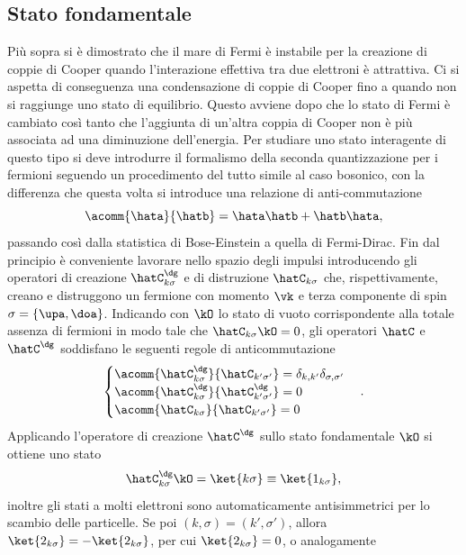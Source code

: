\subsection{Stato fondamentale}
Più sopra si è dimostrato che il mare di Fermi è instabile per la creazione di coppie di Cooper quando l'interazione effettiva tra due elettroni è attrattiva. Ci si aspetta di conseguenza una condensazione di coppie di Cooper fino a quando non si raggiunge uno stato di equilibrio. Questo avviene dopo che lo stato di Fermi è cambiato così tanto che l'aggiunta di un'altra coppia di Cooper non è più associata ad una diminuzione dell'energia. Per studiare uno stato interagente di questo tipo si deve introdurre il formalismo della seconda quantizzazione per i fermioni seguendo un procedimento del tutto simile al caso bosonico, con la differenza che questa volta si introduce una relazione di anti-commutazione
\begin{equation}
    \acomm{\hata}{\hatb} = \hata\hatb + \hatb\hata,
\end{equation}
passando così dalla statistica di Bose-Einstein a quella di Fermi-Dirac. Fin dal principio è conveniente lavorare nello spazio degli impulsi introducendo gli operatori di creazione $\hatC^\dg_{k\sigma}$ e di distruzione $\hatC_{k\sigma}$ che, rispettivamente, creano e distruggono un fermione con momento $\vk$ e terza componente di spin $\sigma = \{\upa,\doa\}$. Indicando con $\kO$ lo stato di vuoto corrispondente alla totale assenza di fermioni in modo tale che $\hatC_{k\sigma}\kO = 0$, gli operatori $\hatC$ e $\hatC^\dg$ soddisfano le seguenti regole di anticommutazione
\begin{equation}
    \begin{cases}
        \acomm{\hatC_{k\sigma}^\dg}{\hatC_{k'\sigma'}} = \delta_{k,k'}\delta_{\sigma,\sigma'} \\
        \acomm{\hatC_{k\sigma}^\dg}{\hatC^\dg_{k'\sigma'}} = 0 \\
        \acomm{\hatC_{k\sigma}}{\hatC_{k'\sigma'}} = 0
    \end{cases}.
\end{equation}
Applicando l'operatore di creazione $\hatC^\dg$ sullo stato fondamentale $\kO$ si ottiene uno stato 
\begin{equation}
    \hatC^\dg_{k\sigma}\kO = \ket{k\sigma} \equiv \ket{1_{k\sigma}},
\end{equation}
inoltre gli stati a molti elettroni sono automaticamente antisimmetrici per lo scambio delle particelle. Se poi $(k,\sigma) = (k',\sigma')$, allora $\ket{2_{k\sigma}} = -\ket{2_{k\sigma}}$, per cui $\ket{2_{k\sigma}} = 0$, o analogamente

